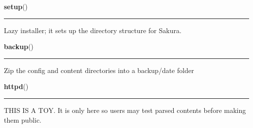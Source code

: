    \label{sakura:setup}

    \vspace{0.5ex}

\hspace{.8\funcindent}\begin{boxedminipage}{\funcwidth}

    \raggedright \textbf{setup}()

    \vspace{-1.5ex}

    \rule{\textwidth}{0.5\fboxrule}
\setlength{\parskip}{2ex}
    Lazy installer; it sets up the directory structure for Sakura.

\setlength{\parskip}{1ex}
    \end{boxedminipage}

    \label{sakura:backup}

    \vspace{0.5ex}

\hspace{.8\funcindent}\begin{boxedminipage}{\funcwidth}

    \raggedright \textbf{backup}()

    \vspace{-1.5ex}

    \rule{\textwidth}{0.5\fboxrule}
\setlength{\parskip}{2ex}
    Zip the config and content directories into a backup/date folder

\setlength{\parskip}{1ex}
    \end{boxedminipage}

    \label{sakura:httpd}

    \vspace{0.5ex}

\hspace{.8\funcindent}\begin{boxedminipage}{\funcwidth}

    \raggedright \textbf{httpd}()

    \vspace{-1.5ex}

    \rule{\textwidth}{0.5\fboxrule}
\setlength{\parskip}{2ex}
    THIS IS A TOY. It is only here so users may test parsed contents before
    making them public.

\setlength{\parskip}{1ex}
    \end{boxedminipage}

